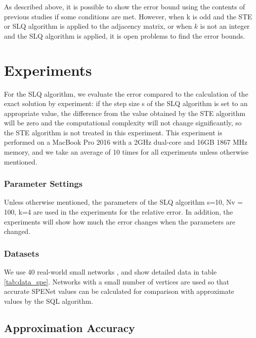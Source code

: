 \documentclass[senior,final,11pt]{iscs-thesis}
\begin{document}
As described above, it is possible to show the error bound using the contents of previous studies if some conditions are met. However, when k is odd and the STE or SLQ algorithm is applied to the adjacency matrix, or when $k$ is not an integer and the SLQ algorithm is applied, it is open problems to find the error bounds.

\section{Experiments}
For the SLQ algorithm, we evaluate the error compared to the calculation of the exact solution by experiment: if the step size s of the SLQ algorithm is set to an appropriate value, the difference from the value obtained by the STE algorithm will be zero and the computational complexity will not change significantly, so the STE algorithm is not treated in this experiment. This experiment is performed on a MacBook Pro 2016 with a 2GHz dual-core and 16GB 1867 MHz memory, and we take an average of 10 times for all experiments unless otherwise mentioned.

\subsubsection*{Parameter Settings}
Unless otherwise mentioned, the parameters of the SLQ algorithm s=10, Nv = 100, k=4 are used in the experiments for the relative error. In addition, the experiments will show how much the error changes when the parameters are changed.

\subsubsection*{Datasets}
We use 40 real-world small networks \cite{nr}, and show detailed data in table \ref{tab:data_spe}. Networks with a small number of vertices are used so that accurate SPENet values can be calculated for comparison with approximate values by the SQL algorithm.

\subsection{Approximation Accuracy}
\end{document}
